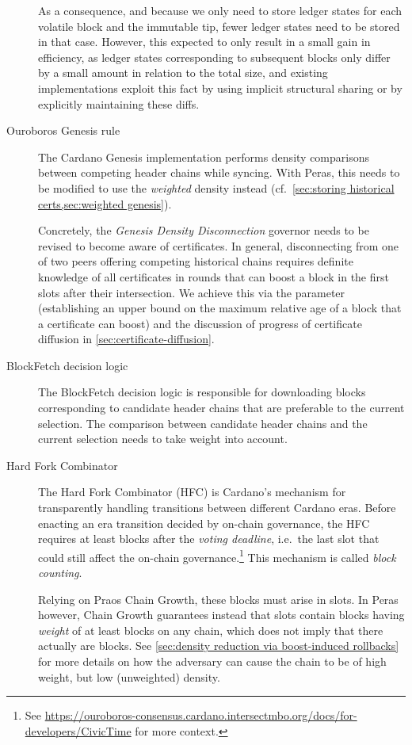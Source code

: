 \begin{description}
  As a consequence, and because we only need to store ledger states for each volatile block and the immutable tip, fewer ledger states need to be stored in that case.
  However, this expected to only result in a small gain in efficiency, as ledger states corresponding to subsequent blocks only differ by a small amount in relation to the total size, and existing implementations exploit this fact by using implicit structural sharing or by explicitly maintaining these diffs.
\item[Ouroboros Genesis rule]
  The Cardano Genesis implementation \parencite{genesis-implementation-documentation} performs density comparisons between competing header chains while syncing.
  With Peras, this needs to be modified to use the \emph{weighted} density instead (cf.~\cref{sec:storing historical certs,sec:weighted genesis}).

  Concretely, the \emph{Genesis Density Disconnection} governor needs to be revised to become aware of certificates.
  In general, disconnecting from one of two peers offering competing historical chains requires definite knowledge of all certificates in rounds that can boost a block in the first \sgen{} slots after their intersection.
  We achieve this via the \perasBlockMaxSlots{} parameter (establishing an upper bound on the maximum relative age of a block that a certificate can boost) and the discussion of progress of certificate diffusion in \cref{sec:certificate-diffusion}.
\item[BlockFetch decision logic]
  The BlockFetch decision logic is responsible for downloading blocks corresponding to candidate header chains that are preferable to the current selection.
  The comparison between candidate header chains and the current selection needs to take weight into account.
\item[Hard Fork Combinator]
  The Hard Fork Combinator (HFC) is Cardano's mechanism for transparently handling transitions between different Cardano eras.
  Before enacting an era transition decided by on-chain governance, the HFC requires at least \kcp{} blocks after the \emph{voting deadline}, i.e.\ the last slot that could still affect the on-chain governance.\footnote{
    See \url{https://ouroboros-consensus.cardano.intersectmbo.org/docs/for-developers/CivicTime} for more context.}
  This mechanism is called \emph{block counting}.

  Relying on Praos Chain Growth, these \kcp{} blocks must arise in \Tcp{} slots.
  In Peras however, Chain Growth guarantees instead that \Tcp{} slots contain blocks having \emph{weight} of at least \kcp{} blocks on any chain, which does not imply that there actually are \kcp{} blocks.
  See \cref{sec:density reduction via boost-induced rollbacks} for more details on how the adversary can cause the chain to be of high weight, but low (unweighted) density.


\end{description}
